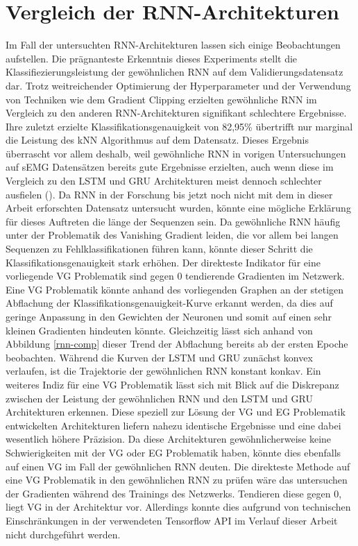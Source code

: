 \section{Vergleich der RNN-Architekturen}
\label{sec:rnn-comp}

Im Fall der untersuchten RNN-Architekturen lassen sich einige Beobachtungen aufstellen. Die prägnanteste Erkenntnis dieses Experiments stellt die Klassifiezierungsleistung der gewöhnlichen RNN auf dem Validierungsdatensatz dar. Trotz weitreichender Optimierung der Hyperparameter und der Verwendung von Techniken wie dem Gradient Clipping erzielten gewöhnliche RNN im Vergleich zu den anderen RNN-Architekturen signifikant schlechtere Ergebnisse. Ihre zuletzt erzielte Klassifikationsgenauigkeit von 82,95\% übertrifft nur marginal die Leistung des kNN Algorithmus auf dem Datensatz. Dieses Ergebnis überrascht vor allem deshalb, weil gewöhnliche RNN in vorigen Untersuchungen auf sEMG Datensätzen bereits gute Ergebnisse erzielten, auch wenn diese im Vergleich zu den LSTM und GRU Architekturen meist dennoch schlechter ausfielen (\cite{simao2019emg}). Da RNN in der Forschung bis jetzt noch nicht mit dem in dieser Arbeit erforschten Datensatz untersucht wurden, könnte eine mögliche Erklärung für dieses Auftreten die länge der Sequenzen sein. Da gewöhnliche RNN häufig unter der Problematik des Vanishing Gradient leiden, die vor allem bei langen Sequenzen zu Fehlklassifikationen führen kann, könnte dieser Schritt die Klassifikationsgenauigkeit stark erhöhen. Der direkteste Indikator für eine vorliegende VG Problematik sind gegen 0 tendierende Gradienten im Netzwerk. Eine VG Problematik könnte anhand des vorliegenden Graphen an der stetigen Abflachung der Klassifikationsgenauigkeit-Kurve erkannt werden, da dies auf geringe Anpassung in den Gewichten der Neuronen und somit auf einen sehr kleinen Gradienten hindeuten könnte. Gleichzeitig lässt sich anhand von Abbildung \ref{rnn-comp} dieser Trend der Abflachung bereits ab der ersten Epoche beobachten. Während die Kurven der LSTM und GRU zunächst konvex verlaufen, ist die Trajektorie der gewöhnlichen RNN konstant konkav. Ein weiteres Indiz für eine VG Problematik lässt sich mit Blick auf die Diskrepanz zwischen der Leistung der gewöhnlichen RNN und den LSTM und GRU Architekturen erkennen. Diese speziell zur Lösung der VG und EG Problematik entwickelten Architekturen liefern nahezu identische Ergebnisse und eine dabei wesentlich höhere Präzision. Da diese Architekturen gewöhnlicherweise keine Schwierigkeiten mit der VG oder EG Problematik haben, könnte dies ebenfalls auf einen VG im Fall der gewöhnlichen RNN deuten. Die direkteste Methode auf eine VG Problematik in den gewöhnlichen RNN zu prüfen wäre das untersuchen der Gradienten während des Trainings des Netzwerks. Tendieren diese gegen 0, liegt VG in der Architektur vor. Allerdings konnte dies aufgrund von technischen Einschränkungen in der verwendeten Tensorflow API im Verlauf dieser Arbeit nicht durchgeführt werden.

